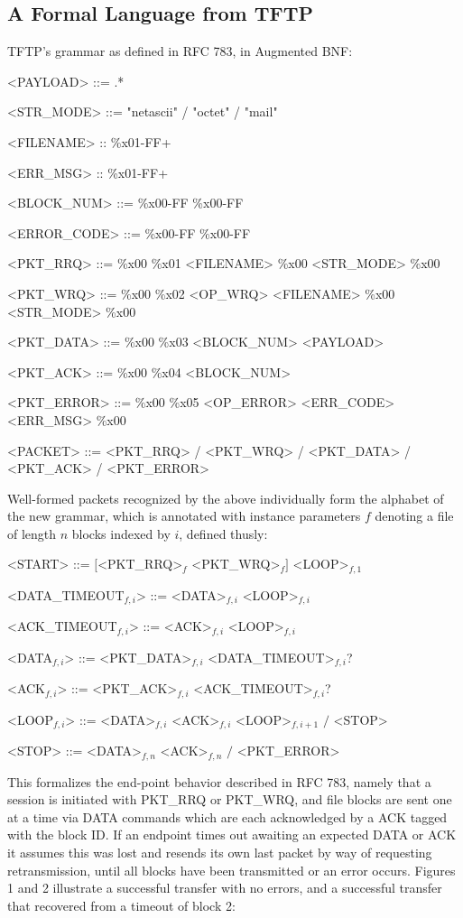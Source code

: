 \documentclass[a0,landscape]{a0poster}
\begin{document}
\begin{multicols}{4}
\section*{A Formal Language from TFTP}

TFTP's grammar as defined in RFC 783, in Augmented BNF:
\begin{grammar}
<PAYLOAD> ::= .*

<STR\_MODE> ::= "netascii" / "octet" / "mail"

<FILENAME> :: {\%x01-FF}+

<ERR\_MSG> :: {\%x01-FF}+

<BLOCK\_NUM> ::= \%x00-FF \%x00-FF

<ERROR\_CODE> ::= \%x00-FF \%x00-FF

<PKT\_RRQ> ::= \%x00 \%x01 <FILENAME> \%x00 <STR\_MODE> \%x00

<PKT\_WRQ> ::= \%x00 \%x02 <OP\_WRQ> <FILENAME> \%x00 <STR\_MODE> \%x00

<PKT\_DATA> ::= \%x00 \%x03 <BLOCK\_NUM> <PAYLOAD>

<PKT\_ACK> ::= \%x00 \%x04 <BLOCK\_NUM>

<PKT\_ERROR> ::= \%x00 \%x05 <OP\_ERROR> <ERR\_CODE> <ERR\_MSG> \%x00

<PACKET> ::= <PKT\_RRQ> / <PKT\_WRQ> / <PKT\_DATA> / <PKT\_ACK> / <PKT\_ERROR>
\end{grammar}

Well-formed packets recognized by the above individually form the alphabet of the new grammar, which is annotated with instance parameters $f$ denoting a file of length $n$ blocks indexed by $i$, defined thusly:

\begin{grammar}
<START> ::= $\big[$<PKT\_RRQ>$_{f}$ <PKT\_WRQ>$_{f}\big]$ <LOOP>$_{f,1}$

<DATA\_TIMEOUT$_{f,i}$> ::= <DATA>$_{f,i}$ <LOOP>$_{f,i}$

<ACK\_TIMEOUT$_{f,i}$> ::= <ACK>$_{f,i}$ <LOOP>$_{f,i}$

<DATA$_{f,i}$> ::= <PKT\_DATA>$_{f,i}$ <DATA\_TIMEOUT>$_{f,i}$?

<ACK$_{f,i}$> ::= <PKT\_ACK>$_{f,i}$ <ACK\_TIMEOUT>$_{f,i}$?

<LOOP$_{f,i}$> ::= <DATA>$_{f,i}$ <ACK>$_{f,i}$ <LOOP>$_{f,i+1}$ $\big/$ <STOP>

<STOP> ::= <DATA>$_{f,n}$ <ACK>$_{f,n}$ $\big/$ <PKT\_ERROR>
\end{grammar}

This formalizes the end-point behavior described in RFC 783, namely that a session is initiated with PKT\_RRQ or PKT\_WRQ, and file blocks are sent one at a time via DATA commands which are each acknowledged by a ACK tagged with the block ID. If an endpoint times out awaiting an expected DATA or ACK it assumes this was lost and resends its own last packet by way of requesting retransmission, until all blocks have been transmitted or an error occurs. Figures 1 and 2 illustrate a successful transfer with no errors, and a successful transfer that recovered from a timeout of block 2:


\end{multicols}
\end{document}

